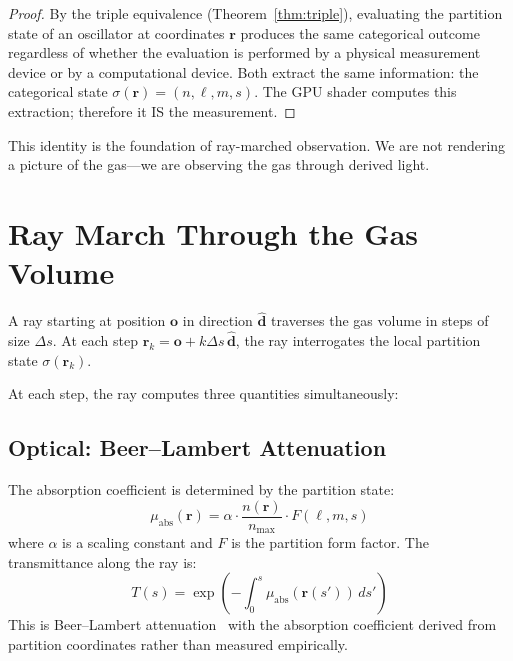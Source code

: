 \begin{proof}
By the triple equivalence (Theorem~\ref{thm:triple}), evaluating the partition state of an oscillator at coordinates $\mathbf{r}$ produces the same categorical outcome regardless of whether the evaluation is performed by a physical measurement device or by a computational device. Both extract the same information: the categorical state $\sigma(\mathbf{r}) = (n, \ell, m, s)$. The GPU shader computes this extraction; therefore it IS the measurement.
\end{proof}

This identity is the foundation of ray-marched observation. We are not rendering a picture of the gas---we are observing the gas through derived light.

\section{Ray March Through the Gas Volume}
\label{sec:ray_march}

\begin{definition}
A ray starting at position $\mathbf{o}$ in direction $\hat{\mathbf{d}}$ traverses the gas volume in steps of size $\Delta s$. At each step $\mathbf{r}_k = \mathbf{o} + k\Delta s\,\hat{\mathbf{d}}$, the ray interrogates the local partition state $\sigma(\mathbf{r}_k)$.
\end{definition}

At each step, the ray computes three quantities simultaneously:

\subsection{Optical: Beer--Lambert Attenuation}

The absorption coefficient is determined by the partition state:
\begin{equation}
    \mu_{\mathrm{abs}}(\mathbf{r}) = \alpha \cdot \frac{n(\mathbf{r})}{n_{\max}} \cdot F(\ell, m, s)
\end{equation}
where $\alpha$ is a scaling constant and $F$ is the partition form factor. The transmittance along the ray is:
\begin{equation}
    T(s) = \exp\!\left(-\int_0^s \mu_{\mathrm{abs}}(\mathbf{r}(s'))\, ds'\right)
\end{equation}
This is Beer--Lambert attenuation~\cite{beer1852} with the absorption coefficient derived from partition coordinates rather than measured empirically.

